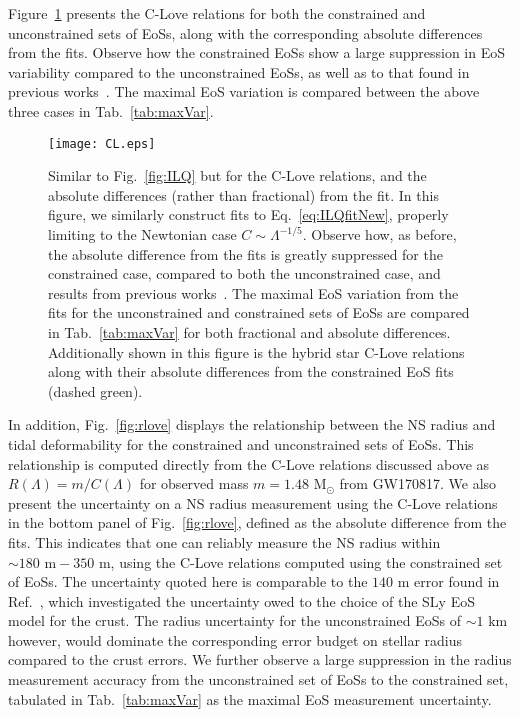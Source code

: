 \documentclass[prd,twocolumn,nofootinbib,superscriptaddress,amsmath,amssymb]{revtex4-1}
\begin{document}
Figure~\ref{fig:clove} presents the C-Love relations for both the constrained and unconstrained sets of EoSs, along with the corresponding absolute differences from the fits. 
Observe how the constrained EoSs show a large suppression in EoS variability compared to the unconstrained EoSs, as well as to that found in previous works~\cite{Yagi:binLove}.
The maximal EoS variation is compared between the above three cases in Tab.~\ref{tab:maxVar}.
\begin{figure}
\begin{center} 
\texttt{[image: CL.eps]}
\end{center}
\caption{
Similar to Fig.~\ref{fig:ILQ} but for the C-Love relations, and the absolute differences (rather than fractional) from the fit.
In this figure, we similarly construct fits to  Eq.~\ref{eq:ILQfitNew}, properly limiting to the Newtonian case $C \sim \Lambda^{-1/5}$.
Observe how, as before, the absolute difference from the fits is greatly suppressed for the constrained case, compared to both the unconstrained case, and results from previous works~\cite{Yagi:binLove}.
The maximal EoS variation from the fits for the unconstrained and constrained sets of EoSs are compared in Tab.~\ref{tab:maxVar} for both fractional and absolute differences.
Additionally shown in this figure is the hybrid star C-Love relations along with their absolute differences from the constrained EoS fits (dashed green).
}
\label{fig:clove}
\end{figure} 

In addition, Fig.~\ref{fig:rlove} displays the relationship between the NS radius and tidal deformability for the constrained and unconstrained sets of EoSs.
This relationship is computed directly from the C-Love relations discussed above as $R(\Lambda)=m/C(\Lambda)$ for observed mass $m=1.48\text{ M}_{\odot}$ from GW170817.
We also present the uncertainty on a NS radius measurement using the C-Love relations in the bottom panel of Fig.~\ref{fig:rlove}, defined as the absolute difference from the fits.
This indicates that one can reliably measure the NS radius within $\sim 180 \text{ m} -350$ m, using the C-Love relations computed using the constrained set of EoSs.
The uncertainty quoted here is comparable to the $140\text{ m}$ error found in Ref.~\cite{Gamba:2019kwu}, which investigated the uncertainty owed to the choice of the SLy EoS model for the crust.
The radius uncertainty for the unconstrained EoSs of $\sim1\text{ km}$ however, would dominate the corresponding error budget on stellar radius compared to the crust errors.
We further observe a large suppression in the radius measurement accuracy from the unconstrained set of EoSs to the constrained set, tabulated in Tab.~\ref{tab:maxVar} as the maximal EoS measurement uncertainty.
\end{document}
